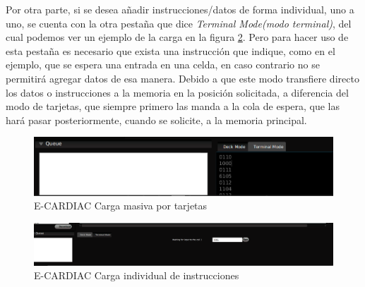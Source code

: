 \documentclass[letterpaper,12pt,oneside]{book}
\begin{document}
    Por otra parte, si se desea añadir instrucciones/datos de forma individual, uno a uno, se cuenta
	con la otra pestaña que dice \textit{Terminal Mode(modo terminal)},  del cual podemos ver un ejemplo de la carga en la figura \ref{fig:ecardiacTerminalMode}. Pero para hacer uso
	de esta pestaña es necesario que exista una instrucción que indique, como en el ejemplo,  que se espera una entrada en una celda, en caso contrario
	no se permitirá agregar datos de esa manera. Debido a que este modo transfiere directo los datos o instrucciones a la memoria en la posición solicitada,
	a diferencia del modo de tarjetas, que siempre primero las manda a la cola de espera, que las hará pasar posteriormente, cuando se solicite,
	a la memoria principal.


	\begin{figure}[h]
 			\centering
			\includegraphics[scale=0.4]{media/ECARDIAC/DeckModeLoaded.png}
			\caption{E-CARDIAC Carga masiva por tarjetas}
			\label{fig:ecardiacDeckMode}
	\end{figure}
	
	\begin{figure}[h]
 			\centering
			\includegraphics[scale=0.25]{media/ECARDIAC/TerminalMode.png}
			\caption{E-CARDIAC Carga individual de instrucciones}
			\label{fig:ecardiacTerminalMode}
	\end{figure}
	
\end{document}
